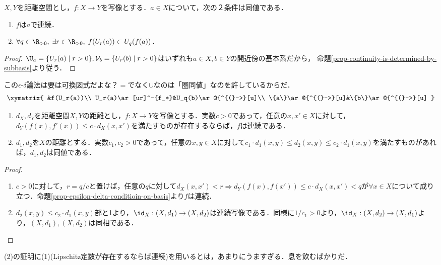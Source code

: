 \documentclass[uplatex,dvipdfmx]{jsreport}
\begin{document}
\begin{proposition}\label{prop-epsilon-delta-conditioin-on-basis}
    $X,Y$を距離空間とし，$f:X\to Y$を写像とする．$a\in X$について，次の２条件は同値である．
    \begin{enumerate}
        \item $f$は$a$で連続．
        \item $\forall q\in\R_{>0},\;\exists r\in\R_{>0},\;f(U_r(a))\subset U_q(f(a))$．
    \end{enumerate}
\end{proposition}
\begin{proof}
    $\U_a=\{U_r(a)\mid r>0\},\mathcal{V}_b=\{U_r(b)\mid r>0\}$はいずれも$a\in X,b\in Y$の開近傍の基本系だから，
    命題\ref{prop-continuity-is-determined-by-subbasis}より従う．
\end{proof}
\begin{remark}
    この$\epsilon$-$\delta$論法は要は可換図式だよな？$=$でなく$\cup$なのは「圏同値」なのを許しているからだ．
    \[\xymatrix{
        &f(U_r(a))\\
        U_r(a)\ar[ur]^-{f_*}&U_q(b)\ar@{^{(}->}[u]\\
        \{a\}\ar@{^{(}->}[u]&\{b\}\ar@{^{(}->}[u]
    }\]
\end{remark}

\begin{corollary}\mbox{}\label{cor-characterization-distance-function}
    \begin{enumerate}
        \item $d_X,d_Y$を距離空間$X,Y$の距離とし，$f:X\to Y$を写像とする．実数$c>0$であって，任意の$x,x'\in X$に対して，$d_Y(f(x),f'(x))\le c\cdot d_X(x,x')$を満たすものが存在するならば，$f$は連続である．
        \item $d_1,d_2$を$X$の距離とする．実数$c_1,c_2>0$であって，任意の$x,y\in X$に対して$c_1\cdot d_1(x,y)\le d_2(x,y)\le c_2\cdot d_1(x,y)$を満たすものがあれば，$d_1,d_2$は同値である．
    \end{enumerate}
\end{corollary}
\begin{proof}\mbox{}
    \begin{enumerate}
        \item $c>0$に対して，$r=q/c$と置けば，任意の$q$に対して$d_X(x,x')<r\Rightarrow d_Y(f(x),f(x'))\le c\cdot d_X(x,x')<q$が$\forall x\in X$について成り立つ．命題\ref{prop-epsilon-delta-conditioin-on-basis}より$f$は連続．
        \item $d_2(x,y)\le c_2\cdot d_1(x,y)$部と1より，$\id_X:(X,d_1)\to(X,d_2)$は連続写像である．同様に$1/c_1>0$より，$\id_X:(X,d_2)\to(X,d_1)$より，$(X,d_1),(X,d_2)$は同相である．
    \end{enumerate}
\end{proof}
\begin{remarks}
    (2)の証明に(1)(Lipschitz定数が存在するならば連続)を用いるとは，あまりにうますぎる．息を飲むばかりだ．
\end{remarks}
\end{document}
